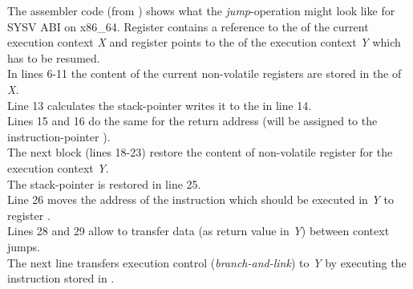 \label{appendix}

The assembler code (from \boostcontext) shows what the \textit{jump}-operation
might look like for SYSV ABI on x86\_64.
Register  contains a reference to the \cblock of the current execution
context \textit{X} and register  points to the \cblock of the execution
context \textit{Y} which has to be resumed.\\
\newline
In lines 6-11 the content of the current non-volatile registers are stored in the
\cblock of \textit{X}.\\
Line 13 calculates the stack-pointer writes it to the \cblock in line 14.\\
Lines 15 and 16 do the same for the return address (will be assigned to the
instruction-pointer ).\\
\newline
The next block (lines 18-23) restore the content of non-volatile register for
the execution context \textit{Y}.\\
The stack-pointer is restored in line 25.\\
Line 26 moves the address of the instruction which should be executed in
\textit{Y} to register .\\
\newline
Lines 28 and 29 allow to transfer data (as return value in \textit{Y}) between
context jumps.\\
\newline
The next line transfers execution control (\textit{branch-and-link}) to
\textit{Y} by executing the instruction stored in .
